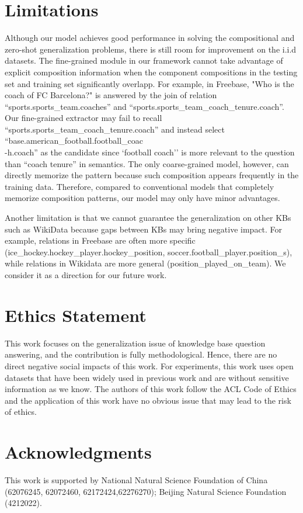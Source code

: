 \documentclass[11pt]{article}
\begin{document}
\section{Limitations}
\label{sec:limitation}
Although our model achieves good performance in solving the compositional and zero-shot generalization problems, there is still room for improvement on the i.i.d datasets. The fine-grained module in our framework cannot take advantage of explicit composition information when the component compositions in the testing set and training set significantly overlapp. For example, in Freebase, "Who is the coach of FC Barcelona?" is answered by the join of relation ``sports.sports\_team.coaches''
and ``sports.sports\_team\_coach\_tenure.coach''. 
Our fine-grained extractor may fail to recall ``sports.sports\_team\_coach\_tenure.coach'' and instead select ``base.american\_football.football\_coac\\-h.coach'' as the candidate  since `football coach'' is more relevant to the question than ``coach tenure'' in semantics. The only coarse-grained model, however, can directly memorize the pattern because such composition appears frequently in the training data. Therefore, compared to conventional models that completely memorize composition patterns, our model may only have minor advantages.

Another limitation is that we cannot guarantee the generalization on other KBs such as WikiData because gaps between KBs may bring negative impact. For example, relations in Freebase are often more specific (ice\_hockey.hockey\_player.hockey\_position, soccer.football\_player.position\_s), while relations in Wikidata are more general (position\_played\_on\_team). We consider it as a direction for our future work.


\section{Ethics Statement}
This work focuses on the generalization issue of knowledge base question answering, and the contribution is fully methodological. Hence, there are no direct negative social impacts of this work. For experiments, this work uses open datasets that have been widely used in previous work and are without sensitive information as we know. The authors of this work follow the ACL Code of Ethics and the application of this work have no obvious issue that may lead to the risk of ethics.

\section*{Acknowledgments}
This work is supported by National Natural Science Foundation of China (62076245, 62072460, 62172424,62276270); Beijing Natural Science Foundation (4212022).



\appendix

\end{document}
